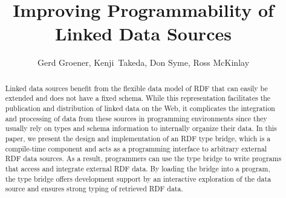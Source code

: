 \documentclass{llncs} %
\begin{document}
\title{Improving Programmability of Linked Data Sources}
 





\author{Gerd Groener, Kenji~Takeda, Don Syme, Ross McKinlay}



\maketitle

\begin{abstract}
Linked data sources benefit from the flexible data model of RDF that
can easily be extended and does not have a fixed schema.
While this representation facilitates the publication and distribution of
linked data on the Web, it complicates the integration and processing of
data from these sources in programming environments since they usually
rely on types and schema information to internally organize their data.
In this paper, we present the design and implementation
of an RDF type bridge, which is a compile-time component and acts
as a programming interface to arbitrary external RDF data sources.
As a result, programmers can use the type bridge to write programs
that access and integrate external RDF data. By loading the bridge into
a program, the type bridge offers development support by an interactive exploration
of the data source and ensures strong typing of retrieved RDF data.
\end{abstract}



%
%
%
%
\end{document}
